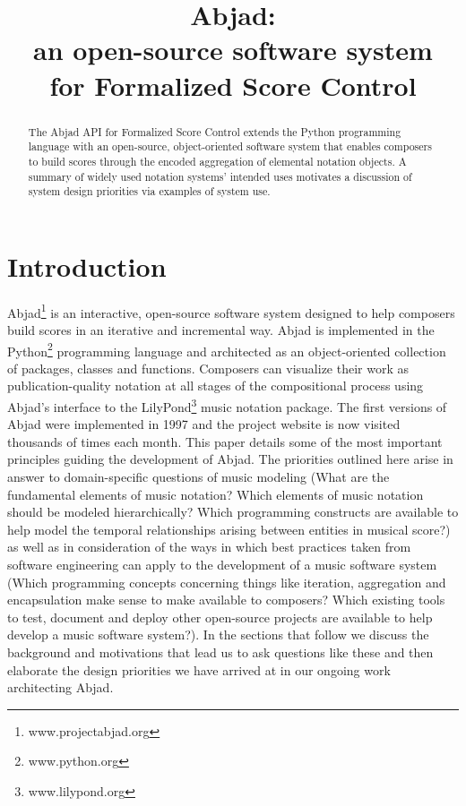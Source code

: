\documentclass{article}
\title{Abjad: \\
an open-source software system \\
for Formalized Score Control}
\begin{document}
\capstartfalse
\maketitle
\capstarttrue

\begin{abstract}
The Abjad API for Formalized Score Control extends the Python programming
language with an open-source, object-oriented software system that enables
composers to build scores through the encoded aggregation of elemental notation
objects. A summary of widely used notation systems' intended uses motivates a
discussion of system design priorities via examples of system use.
\end{abstract}
\section{Introduction} \label{sec:introduction}

Abjad\footnote{www.projectabjad.org} is an interactive, open-source software
system designed to help composers build scores in an iterative and incremental
way.  Abjad is implemented in the Python\footnote{www.python.org} programming
language and architected as an object-oriented collection of packages, classes
and functions. Composers can visualize their work as publication-quality
notation at all stages of the compositional process using Abjad's interface to
the LilyPond\footnote{www.lilypond.org} music notation package. The first
versions of Abjad were implemented in 1997 and the project website is now
visited thousands of times each month. This paper details some of the most
important principles guiding the development of Abjad. The priorities outlined
here arise in answer to domain-specific questions of music modeling (What are
the fundamental elements of music notation? Which elements of music notation
should be modeled hierarchically? Which programming constructs are available to
help model the temporal relationships arising between entities in musical
score?) as well as in consideration of the ways in which best practices taken
from software engineering can apply to the development of a music software
system (Which programming concepts concerning things like iteration,
aggregation and encapsulation make sense to make available to composers? Which
existing tools to test, document and deploy other open-source projects are
available to help develop a music software system?). In the sections that
follow we discuss the background and motivations that lead us to ask questions
like these and then elaborate the design priorities we have arrived at in our
ongoing work architecting Abjad.
\end{document}
